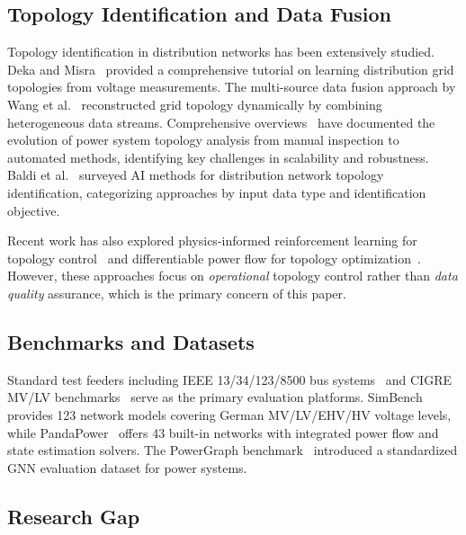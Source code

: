 \documentclass[research]{fcs}
\begin{document}
\subsection{Topology Identification and Data Fusion}

Topology identification in distribution networks has been extensively studied. Deka and Misra~\cite{learning_grid_topologies2022} provided a comprehensive tutorial on learning distribution grid topologies from voltage measurements. The multi-source data fusion approach by Wang et al.~\cite{zhang_topo_imbalanced2025} reconstructed grid topology dynamically by combining heterogeneous data streams. Comprehensive overviews~\cite{topo_overview2024} have documented the evolution of power system topology analysis from manual inspection to automated methods, identifying key challenges in scalability and robustness. Baldi et al.~\cite{baldi2022tutorial} surveyed AI methods for distribution network topology identification, categorizing approaches by input data type and identification objective.

Recent work has also explored physics-informed reinforcement learning for topology control~\cite{hassouna_grl_survey2026} and differentiable power flow for topology optimization~\cite{gao_pg_gcn_opf2024}. However, these approaches focus on \emph{operational} topology control rather than \emph{data quality} assurance, which is the primary concern of this paper.

\subsection{Benchmarks and Datasets}

Standard test feeders including IEEE 13/34/123/8500 bus systems~\cite{ieee13bus1991,ieee_8500_node} and CIGRE MV/LV benchmarks~\cite{cigre_mv2014} serve as the primary evaluation platforms. SimBench~\cite{simbench2020} provides 123 network models covering German MV/LV/EHV/HV voltage levels, while PandaPower~\cite{pandapower2018} offers 43 built-in networks with integrated power flow and state estimation solvers. The PowerGraph benchmark~\cite{powergraph_benchmark2024} introduced a standardized GNN evaluation dataset for power systems.

\subsection{Research Gap}
\end{document}
